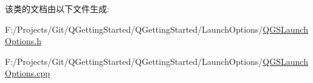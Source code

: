 该类的文档由以下文件生成\+:\begin{DoxyCompactItemize}
\item 
F\+:/\+Projects/\+Git/\+Q\+Getting\+Started/\+Q\+Getting\+Started/\+Launch\+Options/\mbox{\hyperlink{_q_g_s_launch_options_8h}{Q\+G\+S\+Launch\+Options.\+h}}\item 
F\+:/\+Projects/\+Git/\+Q\+Getting\+Started/\+Q\+Getting\+Started/\+Launch\+Options/\mbox{\hyperlink{_q_g_s_launch_options_8cpp}{Q\+G\+S\+Launch\+Options.\+cpp}}\end{DoxyCompactItemize}
